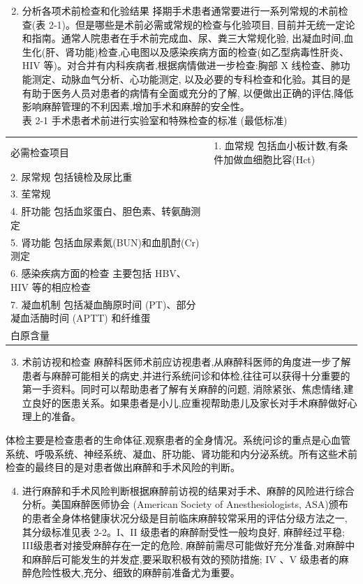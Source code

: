 \documentclass[10pt]{article}
\begin{document}
\begin{enumerate}
  \setcounter{enumi}{1}
  \item 分析各项术前检查和化验结果 择期手术患者通常要进行一系列常规的术前检查(表 2-1)。但是哪些是术前必需或常规的检查与化验项目, 目前并无统一定论和指南。通常人院患者在手术前完成血、尿、粪三大常规化验, 出凝血时间,血生化(肝、肾功能)检查,心电图以及感染疾病方面的检查(如乙型病毒性肝炎、HIV 等)。对合并有内科疾病者,根据病情做进一步检查:胸部 X 线检查、肺功能测定、动脉血气分析、心功能测定, 以及必要的专科检查和化验。其目的是有助于医务人员对患者的病情有全面或充分的了解, 以便做出正确的评估,降低影响麻醉管理的不利因素,增加手术和麻醉的安全性。\\
表 2-1 手术患者术前进行实验室和特殊检查的标准 (最低标准)
\end{enumerate}

\begin{center}
\begin{tabular}{ll}
\hline
必需检查项目 & 1. 血常规 包括血小板计数,有条件加做血细胞比容(Hct) \\
2. 尿常规 包括镜检及尿比重 &  \\
3. 苼常规 &  \\
4. 肝功能 包括血浆蛋白、胆色素、转氨酶测定 &  \\
5. 肾功能 包括血尿素氮(BUN)和血肌酎(Cr)测定 &  \\
6. 感染疾病方面的检查 主要包括 HBV、HIV 等的相应检查 &  \\
7. 凝血机制 包括凝血酶原时间 (PT)、部分凝血活酶时间 (APTT) 和纤维蛋 &  \\
白原含量 &  \\
\end{tabular}
\end{center}

\begin{enumerate}
  \setcounter{enumi}{2}
  \item 术前访视和检查 麻醉科医师术前应访视患者,从麻醉科医师的角度进一步了解患者与麻醉可能相关的病史,并进行系统问诊和体检,往往可以获得十分重要的第一手资料。同时可以帮助患者了解有关麻醉的问题, 消除紧张、焦虑情绪,建立良好的医患关系。如果患者是小儿,应重视帮助患儿及家长对手术麻醉做好心理上的准备。
\end{enumerate}

体检主要是检查患者的生命体征,观察患者的全身情况。系统问诊的重点是心血管系统、呼吸系统、神经系统、凝血、肝功能、肾功能和内分泌系统。所有这些术前检查的最终目的是对患者做出麻醉和手术风险的判断。

\begin{enumerate}
  \setcounter{enumi}{3}
  \item 进行麻醉和手术风险判断根据麻醉前访视的结果对手术、麻醉的风险进行综合分析。美国麻醉医师协会 (American Society of Anesthesiologists, ASA)颁布的患者全身体格健康状况分级是目前临床麻醉较常采用的评估分级方法之一, 其分级标准见表 2-2。I、II 级患者的麻醉耐受性一般均良好, 麻醉经过平稳; III级患者对接受麻醉存在一定的危险, 麻醉前需尽可能做好充分准备,对麻醉中和麻醉后可能发生的并发症,要采取积极有效的预防措施; IV 、V 级患者的麻醉危险性极大,充分、细致的麻醉前准备尤为重要。
\end{enumerate}
\end{document}
